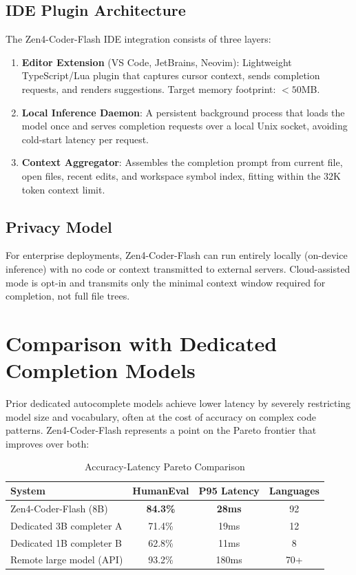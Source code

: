 \documentclass[11pt,a4paper]{article}
\begin{document}
\subsection{IDE Plugin Architecture}

The Zen4-Coder-Flash IDE integration consists of three layers:

\begin{enumerate}
  \item \textbf{Editor Extension} (VS Code, JetBrains, Neovim): Lightweight TypeScript/Lua plugin that captures cursor context, sends completion requests, and renders suggestions. Target memory footprint: $<50$MB.
  \item \textbf{Local Inference Daemon}: A persistent background process that loads the model once and serves completion requests over a local Unix socket, avoiding cold-start latency per request.
  \item \textbf{Context Aggregator}: Assembles the completion prompt from current file, open files, recent edits, and workspace symbol index, fitting within the 32K token context limit.
\end{enumerate}

\subsection{Privacy Model}

For enterprise deployments, Zen4-Coder-Flash can run entirely locally (on-device inference) with no code or context transmitted to external servers. Cloud-assisted mode is opt-in and transmits only the minimal context window required for completion, not full file trees.

\section{Comparison with Dedicated Completion Models}

Prior dedicated autocomplete models achieve lower latency by severely restricting model size and vocabulary, often at the cost of accuracy on complex code patterns. Zen4-Coder-Flash represents a point on the Pareto frontier that improves over both:

\begin{table}[H]
\centering
\caption{Accuracy-Latency Pareto Comparison}
\begin{tabular}{lccc}
\toprule
\textbf{System} & \textbf{HumanEval} & \textbf{P95 Latency} & \textbf{Languages} \\
\midrule
Zen4-Coder-Flash (8B) & \textbf{84.3\%} & \textbf{28ms} & 92 \\
Dedicated 3B completer A & 71.4\% & 19ms & 12 \\
Dedicated 1B completer B & 62.8\% & 11ms & 8 \\
Remote large model (API) & 93.2\% & 180ms & 70+ \\
\bottomrule
\end{tabular}
\end{table}
\end{document}
